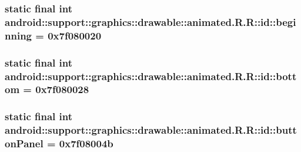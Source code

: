 \hypertarget{classandroid_1_1support_1_1graphics_1_1drawable_1_1animated_1_1_r_1_1id_3931da752d99f98458424af36e9eb43e}{
\subsubsection[{beginning}]{\setlength{\rightskip}{0pt plus 5cm}static final int android::support::graphics::drawable::animated.R.R::id::beginning = 0x7f080020}}
\label{classandroid_1_1support_1_1graphics_1_1drawable_1_1animated_1_1_r_1_1id_3931da752d99f98458424af36e9eb43e}


\hypertarget{classandroid_1_1support_1_1graphics_1_1drawable_1_1animated_1_1_r_1_1id_8ebc4bb13ee88d58f2524d4f3fb5be25}{
\subsubsection[{bottom}]{\setlength{\rightskip}{0pt plus 5cm}static final int android::support::graphics::drawable::animated.R.R::id::bottom = 0x7f080028}}
\label{classandroid_1_1support_1_1graphics_1_1drawable_1_1animated_1_1_r_1_1id_8ebc4bb13ee88d58f2524d4f3fb5be25}


\hypertarget{classandroid_1_1support_1_1graphics_1_1drawable_1_1animated_1_1_r_1_1id_69447abdc604819cb8e194225b2221b9}{
\subsubsection[{buttonPanel}]{\setlength{\rightskip}{0pt plus 5cm}static final int android::support::graphics::drawable::animated.R.R::id::buttonPanel = 0x7f08004b}}
\label{classandroid_1_1support_1_1graphics_1_1drawable_1_1animated_1_1_r_1_1id_69447abdc604819cb8e194225b2221b9}


